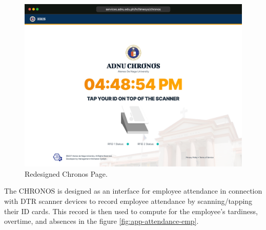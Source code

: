     \begin{figure}[H]
        \centering
        \includegraphics[width=1\linewidth]{figures/app/chronos.png}
        \caption{Redesigned Chronos Page.}
        \label{fig:app-chronos}
    \end{figure}

    The CHRONOS is designed as an interface for employee attendance in connection with DTR scanner devices to record employee attendance by scanning/tapping their ID cards. This record is then used to compute for the employee's tardiness, overtime, and absences in the figure \ref*{fig:app-attendance-emp}.